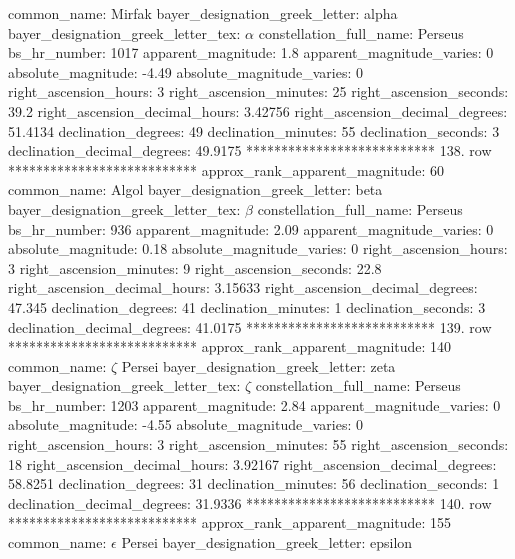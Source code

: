                        common_name: Mirfak
    bayer_designation_greek_letter: alpha
bayer_designation_greek_letter_tex: $\alpha$
           constellation_full_name: Perseus
                      bs_hr_number: 1017
                apparent_magnitude: 1.8
         apparent_magnitude_varies: 0
                absolute_magnitude: -4.49
         absolute_magnitude_varies: 0
             right_ascension_hours: 3
           right_ascension_minutes: 25
           right_ascension_seconds: 39.2
     right_ascension_decimal_hours: 3.42756
   right_ascension_decimal_degrees: 51.4134
               declination_degrees: 49
               declination_minutes: 55
               declination_seconds: 3
       declination_decimal_degrees: 49.9175
*************************** 138. row ***************************
    approx_rank_apparent_magnitude: 60
                       common_name: Algol
    bayer_designation_greek_letter: beta
bayer_designation_greek_letter_tex: $\beta$
           constellation_full_name: Perseus
                      bs_hr_number: 936
                apparent_magnitude: 2.09
         apparent_magnitude_varies: 0
                absolute_magnitude: 0.18
         absolute_magnitude_varies: 0
             right_ascension_hours: 3
           right_ascension_minutes: 9
           right_ascension_seconds: 22.8
     right_ascension_decimal_hours: 3.15633
   right_ascension_decimal_degrees: 47.345
               declination_degrees: 41
               declination_minutes: 1
               declination_seconds: 3
       declination_decimal_degrees: 41.0175
*************************** 139. row ***************************
    approx_rank_apparent_magnitude: 140
                       common_name: $\zeta$ Persei
    bayer_designation_greek_letter: zeta
bayer_designation_greek_letter_tex: $\zeta$
           constellation_full_name: Perseus
                      bs_hr_number: 1203
                apparent_magnitude: 2.84
         apparent_magnitude_varies: 0
                absolute_magnitude: -4.55
         absolute_magnitude_varies: 0
             right_ascension_hours: 3
           right_ascension_minutes: 55
           right_ascension_seconds: 18
     right_ascension_decimal_hours: 3.92167
   right_ascension_decimal_degrees: 58.8251
               declination_degrees: 31
               declination_minutes: 56
               declination_seconds: 1
       declination_decimal_degrees: 31.9336
*************************** 140. row ***************************
    approx_rank_apparent_magnitude: 155
                       common_name: $\epsilon$ Persei
    bayer_designation_greek_letter: epsilon
